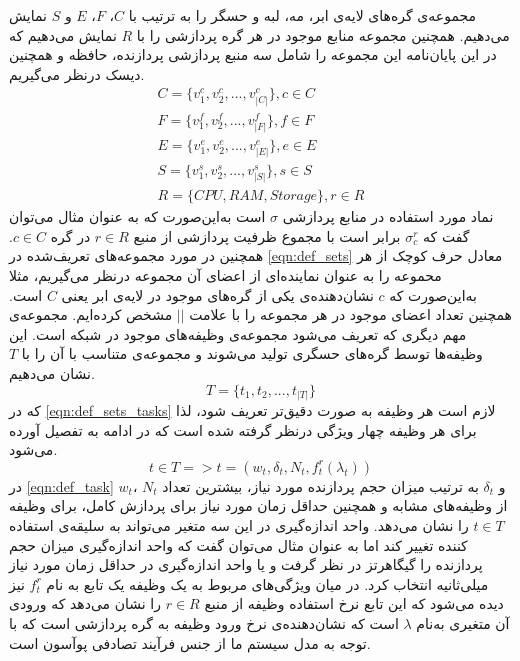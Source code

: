     مجموعه‌ی گره‌های لایه‌ی ابر، مه، لبه و حسگر را به ترتیب با $C$، $F$، $E$ و $S$ نمایش می‌دهیم. همچنین مجموعه منابع موجود در هر گره پردازشی را با $R$ نمایش می‌دهیم که در این پایان‌نامه این مجموعه را شامل سه منبع پردازشی پردازنده، حافظه و همچنین دیسک درنظر می‌گیریم. 
    \begin{subequations}\label{eqn:def_sets}
    	\begin{align}
    	C = \{v_1^c, v_2^c, ..., v_{|C|}^c\} , c \in C\\
    	F = \{v_1^f, v_2^f, ..., v_{|F|}^f\} , f \in F\\
    	E = \{v_1^e, v_2^e, ..., v_{|E|}^e\} , e \in E\\
    	S = \{v_1^s, v_2^s, ..., v_{|S|}^s\} , s \in S\\
    	R = \{CPU, RAM, Storage\} , r \in R
    	\end{align}
    \end{subequations}
    نماد مورد استفاده در منابع پردازشی $\sigma$ است به‌این‌صورت که به عنوان مثال می‌توان گفت که $\sigma_c^r$ برابر است با مجموع ظرفیت پردازشی از منبع $r \in R$ در گره $c \in C$. 
    همچنین در مورد مجموعه‌های تعریف‌‌شده در \cref{eqn:def_sets} معادل حرف کوچک از هر محموعه را به عنوان نماینده‌ای از اعضای آن مجموعه درنظر می‌گیریم، مثلا به‌این‌صورت که $c$ نشان‌دهنده‌ی یکی از گره‌های موجود در لایه‌ی ابر یعنی $C$ است. همچنین تعداد اعضای موجود در هر مجموعه را با علامت $||$ مشخص کرده‌ایم. 
    مجموعه‌ی مهم دیگری که تعریف می‌شود مجموعه‌ی وظیفه‌های موجود در شبکه است. این وظیفه‌ها توسط گره‌های حسگری تولید می‌شوند و مجموعه‌ی متناسب با آن را  با $T$ نشان می‌دهیم. 
    \begin{equation}\label{eqn:def_sets_tasks}
    	T = \{t_1, t_2, ..., t_{|T|}\}
    \end{equation}
	که در \cref{eqn:def_sets_tasks} لازم است هر وظیفه به صورت دقیق‌تر تعریف شود، لذا برای هر وظیفه چهار ویژگی درنظر گرفته شده است که در ادامه به تفصیل آورده می‌شود. 
	\begin{equation}\label{eqn:def_task}
	t \in T => t = (w_t, \delta_t, N_t, f_t^r(\lambda_t))
	\end{equation}
	در \cref{eqn:def_task} $w_t$، $N_t$ و $\delta_t$ به ترتیب میزان حجم پردازنده مورد نیاز، بیشترین تعداد از وظیفه‌های مشابه و همچنین حداقل زمان مورد نیاز برای پردازش کامل، برای وظیفه $t \in T$ را نشان می‌دهد. واحد اندازه‌گیری در این سه متغیر می‌تواند به سلیقه‌ی استفاده کننده تغییر کند اما به عنوان مثال می‌توان گفت که واحد اندازه‌گیری میزان حجم پردازنده را گیگاهرتز در نظر گرفت  و یا واحد اندازه‌گیری در حداقل زمان مورد نیاز میلی‌ثانیه انتخاب کرد. در میان ویژگی‌های مربوط به یک وظیفه یک تابع به نام $f_t^r$ نیز دیده می‌شود که این تابع نرخ استفاده وظیفه از منبع $r \in R$ را نشان می‌دهد که ورودی آن متغیری به‌نام $\lambda$ است که نشان‌دهنده‌ی نرخ ورود وظیفه به گره پردازشی است که با توجه به مدل سیستم ما از جنس فرآیند تصادفی پوآسون است. 
	
